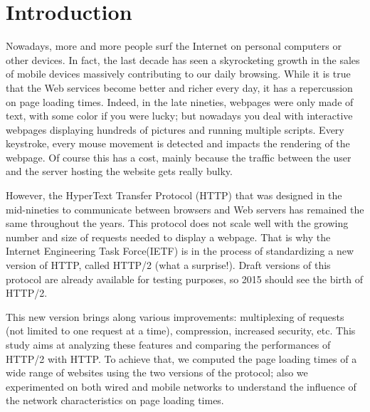 \documentclass[10pt,aps,showpacs,nofootinbib,superscriptaddress,eqsecnum,prd,showkeys,twocolumn,notitlepage]{article}
\begin{document}
\maketitle

\begin{abstract}
\end{abstract}

\section{Introduction}
Nowadays, more and more people surf the Internet on personal computers or other devices. In fact, the last decade has seen a skyrocketing growth in the sales of mobile devices massively contributing to our daily browsing. While it is true that the Web services become better and richer every day, it has a repercussion on page loading times. Indeed, in the late nineties, webpages were only made of text, with some color if you were lucky; but nowadays you deal with interactive webpages displaying hundreds of pictures and running multiple scripts. Every keystroke, every mouse movement is detected and impacts the rendering of the webpage. Of course this has a cost, mainly because the traffic between the user and the server hosting the website gets really bulky.

However, the HyperText Transfer Protocol (HTTP) that was designed in the mid-nineties to communicate between browsers and Web servers has remained the same throughout the years. This protocol does not scale well with the growing number and size of requests needed to display a webpage. That is why the Internet Engineering Task Force(IETF) is in the process of standardizing a new version of HTTP, called HTTP/2 (what a surprise!). Draft versions of this protocol are already available for testing purposes, so 2015 should see the birth of HTTP/2.

This new version brings along various improvements: multiplexing of requests (not limited to one request at a time), compression, increased security, etc. This study aims at analyzing these features and comparing the performances of HTTP/2 with HTTP. To achieve that, we computed the page loading times of a wide range of websites using the two versions of the protocol; also we experimented on both wired and mobile networks to understand the influence of the network characteristics on page loading times.
\end{document}
